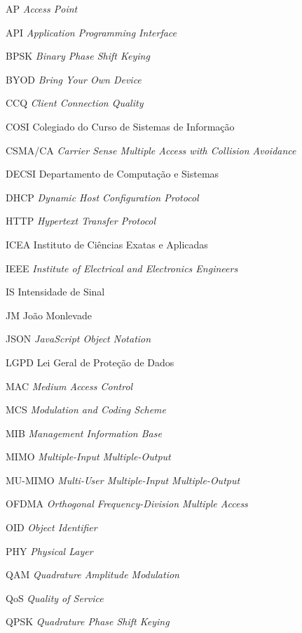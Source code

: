 \begin{siglas}
  \item[AP] \textit{Access Point}
  \item[API] \textit{Application Programming Interface}
  \item[BPSK] \textit{Binary Phase Shift Keying}
  \item[BYOD] \textit{Bring Your Own Device}
  \item[CCQ] \textit{Client Connection Quality}
  \item[COSI] Colegiado do Curso de Sistemas de Informação
  \item[CSMA/CA] \textit{Carrier Sense Multiple Access with Collision Avoidance}
  \item[DECSI] Departamento de Computação e Sistemas
  \item[DHCP] \textit{Dynamic Host Configuration Protocol}
  \item[HTTP] \textit{Hypertext Transfer Protocol}
  \item[ICEA] Instituto de Ciências Exatas e Aplicadas
  \item[IEEE] \textit{Institute of Electrical and Electronics Engineers}
  \item[IS] Intensidade de Sinal
  \item[JM] João Monlevade
  \item[JSON] \textit{JavaScript Object Notation}
  \item[LGPD] Lei Geral de Proteção de Dados
  \item[MAC] \textit{Medium Access Control}
  \item[MCS] \textit{Modulation and Coding Scheme}
  \item[MIB] \textit{Management Information Base}
  \item[MIMO] \textit{Multiple-Input Multiple-Output}
  \item[MU-MIMO] \textit{Multi-User Multiple-Input Multiple-Output}
  \item[OFDMA] \textit{Orthogonal Frequency-Division Multiple Access}
  \item[OID] \textit{Object Identifier}
  \item[PHY] \textit{Physical Layer}
  \item[QAM] \textit{Quadrature Amplitude Modulation}
  \item[QoS] \textit{Quality of Service}
  \item[QPSK] \textit{Quadrature Phase Shift Keying}

\end{siglas}
